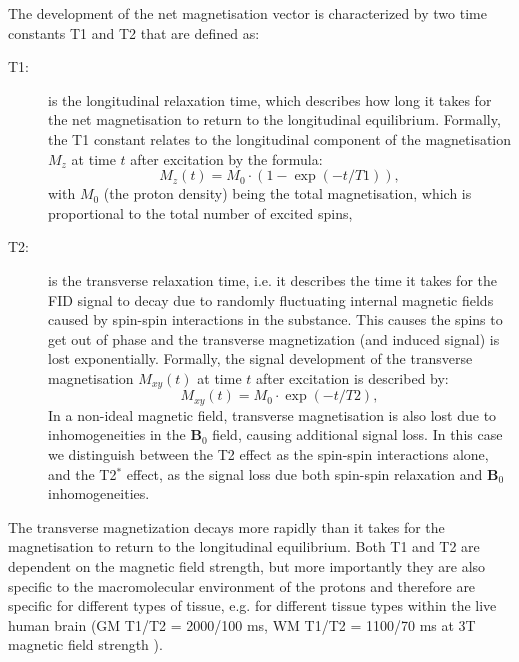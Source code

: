 The development of the net magnetisation vector is characterized by two time constants T1 and T2 that are defined as:  
\begin{description}
	\item[T1:] is the longitudinal relaxation time, which describes how long it takes for the net magnetisation to return to the longitudinal equilibrium. Formally, the T1 constant relates to the longitudinal component of the magnetisation $M_z$ at time $t$ after excitation by the formula:
	\begin{equation}
		M_z(t) = M_0 \cdot (1-\exp(-t/T1)),
	\end{equation} 
	with $M_0$ (the proton density) being the total magnetisation, which is proportional to the total number of excited spins, 
	\item[T2:] is the transverse relaxation time, i.e. it describes the time it takes for the FID signal to decay due to randomly fluctuating internal magnetic fields caused by spin-spin interactions in the substance. This causes the spins to get out of phase and the transverse magnetization (and induced signal) is lost exponentially. Formally, the signal development of the transverse magnetisation $M_{xy}(t)$ at time $t$ after excitation is described by:
	\begin{equation}
		M_{xy}(t) = M_0 \cdot \exp(-t/T2),
	\end{equation} 	
	In a non-ideal magnetic field, transverse magnetisation is also lost due to inhomogeneities in the $\mathbf{B}_0$ field, causing additional signal loss. In this case we distinguish between the T2 effect as the spin-spin interactions alone, and the T2$^*$ effect, as the signal loss due both spin-spin relaxation and $\mathbf{B}_0$ inhomogeneities.
\end{description}

The transverse magnetization decays more rapidly than it takes for the magnetisation to return to the longitudinal equilibrium. Both T1 and T2 are dependent on the magnetic field strength, but more importantly they are also specific to the macromolecular environment of the protons and therefore are specific for different types of tissue, e.g. for different tissue types within the live human brain (\gls{GM} T1/T2 = 2000/100 ms, \gls{WM} T1/T2 = 1100/70 ms at 3T magnetic field strength \citep{Stanisz:2005}).
